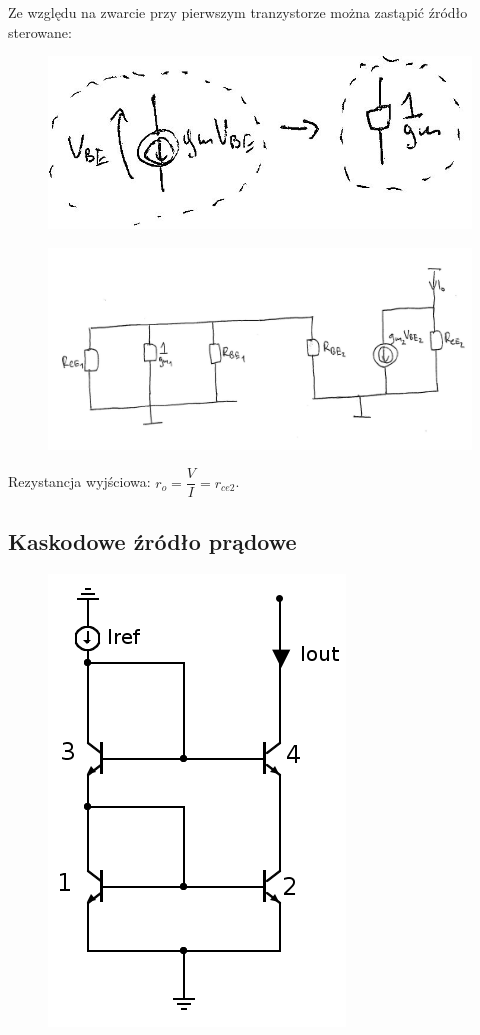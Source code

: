 \documentclass[10pt,a4paper]{article}
\begin{document}
Ze względu na zwarcie przy pierwszym tranzystorze można zastąpić źródło sterowane:
\begin{figure}[H]
\centering
\includegraphics[scale=0.8]{lustr_wyp2}
\end{figure}
\begin{figure}[H]
\centering
\includegraphics[scale=0.8]{lustr_wyp3}
\end{figure}

Rezystancja wyjściowa: $r_o = \dfrac{V}{I} = r_{ce2}$.

\subsection{Kaskodowe źródło prądowe}
\begin{figure}[H]
\centering
\includegraphics[scale=0.5]{kaskoda}
\end{figure}
\end{document}
